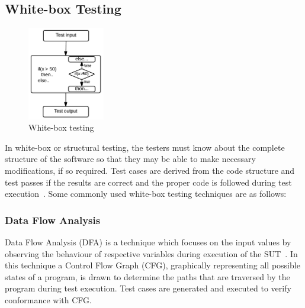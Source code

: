 \subsection{White-box Testing}
\begin{figure}
  \vspace{-35pt}
  \begin{center}
   \includegraphics[width=0.30\textwidth]{chapter2/whiteBox.png}
  \end{center}
  \vspace{-20pt}
  \bigskip
  \caption{White-box testing}
 \vspace{-18pt}
\end{figure}
In white-box or structural testing, the testers must know about the complete structure of the software so that they may be able to make necessary modifications, if so required. Test cases are derived from the code structure and test passes if the results are correct and the proper code is followed during test execution~\cite{ostrand2002white}. Some commonly used white-box testing techniques are as follows:


\subsubsection{Data Flow Analysis}
Data Flow Analysis (DFA) is a technique which focuses on the input values by observing the behaviour of respective variables during execution of the SUT~\cite{clarke1989formal}. In this technique a Control Flow Graph (CFG), graphically representing all possible states of a program, is drawn to determine the paths that are traversed by the program during test execution. Test cases are generated and executed to verify conformance with CFG. 

